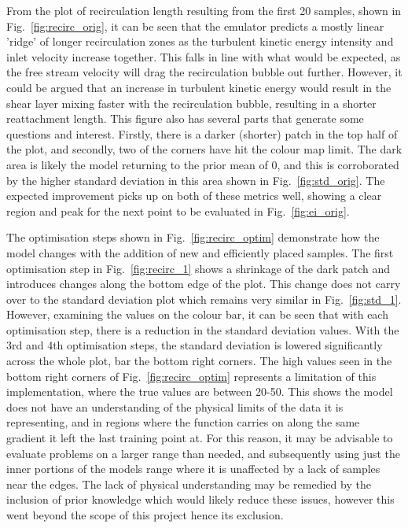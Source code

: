 \documentclass[conference]{IEEEtran}
\begin{document}
From the plot of recirculation length resulting from the first 20 samples, shown in Fig.~\ref{fig:recirc_orig}, it can be seen that the emulator predicts a mostly linear 'ridge' of longer recirculation zones as the turbulent kinetic energy intensity and inlet velocity increase together. This falls in line with what would be expected, as the free stream velocity will drag the recirculation bubble out further. However, it could be argued that an increase in turbulent kinetic energy would result in the shear layer mixing faster with the recirculation bubble, resulting in a shorter reattachment length. This figure also has several parts that generate some questions and interest. Firstly, there is a darker (shorter) patch in the top half of the plot, and secondly, two of the corners have hit the colour map limit. The dark area is likely the model returning to the prior mean of 0, and this is corroborated by the higher standard deviation in this area shown in Fig.~\ref{fig:std_orig}. The expected improvement picks up on both of these metrics well, showing a clear region and peak for the next point to be evaluated in Fig.~\ref{fig:ei_orig}.

The optimisation steps shown in Fig.~\ref{fig:recirc_optim} demonstrate how the model changes with the addition of new and efficiently placed samples. The first optimisation step in Fig.~\ref{fig:recirc_1} shows a shrinkage of the dark patch and introduces changes along the bottom edge of the plot. This change does not carry over to the standard deviation plot which remains very similar in Fig.~\ref{fig:std_1}. However, examining the values on the colour bar, it can be seen that with each optimisation step, there is a reduction in the standard deviation values. With the 3rd and 4th optimisation steps, the standard deviation is lowered significantly across the whole plot, bar the bottom right corners. The high values seen in the bottom right corners of Fig.~\ref{fig:recirc_optim} represents a limitation of this implementation, where the true values are between 20-50. This shows the model does not have an understanding of the physical limits of the data it is representing, and in regions where the function carries on along the same gradient it left the last training point at. For this reason, it may be advisable to evaluate problems on a larger range than needed, and subsequently using just the inner portions of the models range where it is unaffected by a lack of samples near the edges. The lack of physical understanding may be remedied by the inclusion of prior knowledge which would likely reduce these issues, however this went beyond the scope of this project hence its exclusion.
\end{document}

